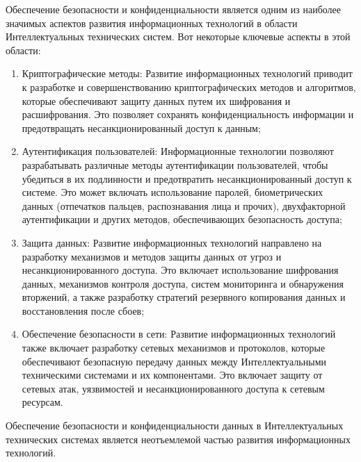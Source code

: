     Обеспечение безопасности и конфиденциальности является одним из наиболее значимых аспектов развития информационных технологий в области Интеллектуальных технических систем. Вот некоторые ключевые аспекты в этой области:
    \begin{enumerate}
        \item Криптографические методы: Развитие информационных технологий приводит к разработке и совершенствованию криптографических методов и алгоритмов, которые обеспечивают защиту данных путем их шифрования и расшифрования. Это позволяет сохранять конфиденциальность информации и предотвращать несанкционированный доступ к данным;
        \item Аутентификация пользователей: Информационные технологии позволяют разрабатывать различные методы аутентификации пользователей, чтобы убедиться в их подлинности и предотвратить несанкционированный доступ к системе. Это может включать использование паролей, биометрических данных (отпечатков пальцев, распознавания лица и прочих), двухфакторной аутентификации и других методов, обеспечивающих безопасность доступа;
        \item Защита данных: Развитие информационных технологий направлено на разработку механизмов и методов защиты данных от угроз и несанкционированного доступа. Это включает использование шифрования данных, механизмов контроля доступа, систем мониторинга и обнаружения вторжений, а также разработку стратегий резервного копирования данных и восстановления после сбоев;
        \item Обеспечение безопасности в сети: Развитие информационных технологий также включает разработку сетевых механизмов и протоколов, которые обеспечивают безопасную передачу данных между Интеллектуальными техническими системами и их компонентами. Это включает защиту от сетевых атак, уязвимостей и несанкционированного доступа к сетевым ресурсам.
    \end{enumerate}

    Обеспечение безопасности и конфиденциальности данных в Интеллектуальных технических системах является неотъемлемой частью развития информационных технологий.

